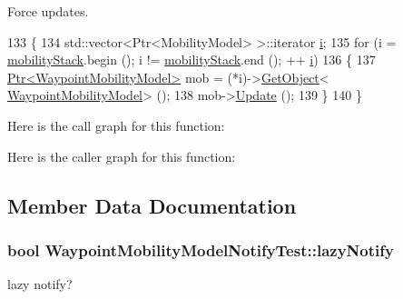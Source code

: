 Force updates. 


\begin{DoxyCode}
133 \{
134   std::vector<Ptr<MobilityModel> >::iterator \hyperlink{bernuolliDistribution_8m_a6f6ccfcf58b31cb6412107d9d5281426}{i};
135   \textcolor{keywordflow}{for} (i = \hyperlink{classWaypointMobilityModelNotifyTest_a7e6de57e6fbec72887e4cc25c7e561d3}{mobilityStack}.begin (); i != \hyperlink{classWaypointMobilityModelNotifyTest_a7e6de57e6fbec72887e4cc25c7e561d3}{mobilityStack}.end (); ++
      \hyperlink{bernuolliDistribution_8m_a6f6ccfcf58b31cb6412107d9d5281426}{i})
136     \{
137       \hyperlink{classns3_1_1Ptr}{Ptr<WaypointMobilityModel>} mob = (*i)->\hyperlink{classns3_1_1Object_a13e18c00017096c8381eb651d5bd0783}{GetObject}<
      \hyperlink{classns3_1_1WaypointMobilityModel}{WaypointMobilityModel}> ();
138       mob->\hyperlink{classns3_1_1WaypointMobilityModel_a243a8be0ea162ae1edfeb4214c5be719}{Update} ();
139     \}
140 \}
\end{DoxyCode}


Here is the call graph for this function\+:




Here is the caller graph for this function\+:




\subsection{Member Data Documentation}
\subsubsection[{\texorpdfstring{lazy\+Notify}{lazyNotify}}]{\setlength{\rightskip}{0pt plus 5cm}bool Waypoint\+Mobility\+Model\+Notify\+Test\+::lazy\+Notify\hspace{0.3cm}{\ttfamily [private]}}\hypertarget{classWaypointMobilityModelNotifyTest_ac3f904848852654223a7a823a0c73107}{}\label{classWaypointMobilityModelNotifyTest_ac3f904848852654223a7a823a0c73107}


lazy notify? 

